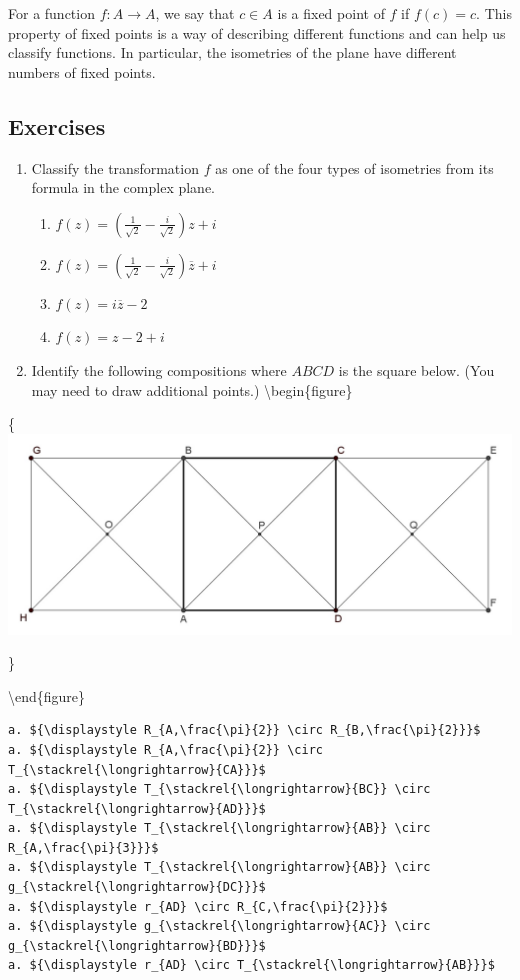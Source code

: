 \documentclass[
]{book}
\providecommand{\tightlist}{%
  \setlength{\itemsep}{0pt}\setlength{\parskip}{0pt}}
\theoremstyle{definition}
\theoremstyle{definition}
\theoremstyle{definition}
\theoremstyle{definition}
\theoremstyle{remark}
\begin{document}
For a function \(f:A\rightarrow A\), we say that \(c\in A\) is a fixed point of \(f\) if \(f(c)=c\). This property of fixed points is a way of describing different functions and can help us classify functions. In particular, the isometries of the plane have different numbers of fixed points.

\hypertarget{exercises-57}{%
\subsection{Exercises}\label{exercises-57}}

\begin{enumerate}
\def\labelenumi{\arabic{enumi}.}
\item
  Classify the transformation \(f\) as one of the four types of isometries from its formula in the complex plane.

  \begin{enumerate}
  \def\labelenumii{\alph{enumii}.}
  \tightlist
  \item
    \(\displaystyle{f(z)=\left( \frac{1}{\sqrt{2}} - \frac{i}{\sqrt{2}} \right) z +i}\)
  \item
    \(\displaystyle{f(z)=\left( \frac{1}{\sqrt{2}} - \frac{i}{\sqrt{2}} \right) \overline{z} +i}\)
  \item
    \(\displaystyle{f(z)=i\overline{z}-2}\)
  \item
    \(\displaystyle{f(z)=z-2+i}\)
  \end{enumerate}
\item
  Identify the following compositions where \(ABCD\) is the square below. (You may need to draw additional points.)
  \textbackslash begin\{figure\}
\end{enumerate}

\{\centering \includegraphics[width=0.5\linewidth]{images/transformationgraph}

\}

\textbackslash end\{figure\}

\begin{verbatim}
a. ${\displaystyle R_{A,\frac{\pi}{2}} \circ R_{B,\frac{\pi}{2}}}$
a. ${\displaystyle R_{A,\frac{\pi}{2}} \circ T_{\stackrel{\longrightarrow}{CA}}}$
a. ${\displaystyle T_{\stackrel{\longrightarrow}{BC}} \circ T_{\stackrel{\longrightarrow}{AD}}}$
a. ${\displaystyle T_{\stackrel{\longrightarrow}{AB}} \circ R_{A,\frac{\pi}{3}}}$
a. ${\displaystyle T_{\stackrel{\longrightarrow}{AB}} \circ g_{\stackrel{\longrightarrow}{DC}}}$
a. ${\displaystyle r_{AD} \circ R_{C,\frac{\pi}{2}}}$
a. ${\displaystyle g_{\stackrel{\longrightarrow}{AC}} \circ g_{\stackrel{\longrightarrow}{BD}}}$
a. ${\displaystyle r_{AD} \circ T_{\stackrel{\longrightarrow}{AB}}}$
\end{verbatim}
\end{document}
